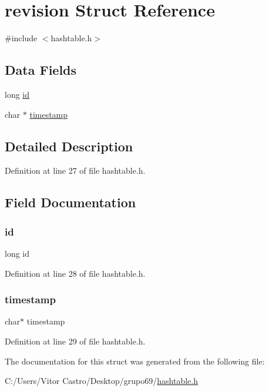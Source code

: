 \hypertarget{structrevision}{}\section{revision Struct Reference}
\label{structrevision}


{\ttfamily \#include $<$hashtable.\+h$>$}

\subsection*{Data Fields}
\begin{DoxyCompactItemize}
\item 
long \hyperlink{structrevision_a7350fbd6ad10618f3b750b1f99ca5c3c}{id}
\item 
char $\ast$ \hyperlink{structrevision_a2f26eae919bf9f5656b4250df8743e28}{timestamp}
\end{DoxyCompactItemize}


\subsection{Detailed Description}


Definition at line 27 of file hashtable.\+h.



\subsection{Field Documentation}
\mbox{\label{structrevision_a7350fbd6ad10618f3b750b1f99ca5c3c}} 
\subsubsection{\texorpdfstring{id}{id}}
{\footnotesize\ttfamily long id}



Definition at line 28 of file hashtable.\+h.

\mbox{\label{structrevision_a2f26eae919bf9f5656b4250df8743e28}} 
\subsubsection{\texorpdfstring{timestamp}{timestamp}}
{\footnotesize\ttfamily char$\ast$ timestamp}



Definition at line 29 of file hashtable.\+h.



The documentation for this struct was generated from the following file\+:\begin{DoxyCompactItemize}
\item 
C\+:/\+Users/\+Vitor Castro/\+Desktop/grupo69/\hyperlink{hashtable_8h}{hashtable.\+h}\end{DoxyCompactItemize}
